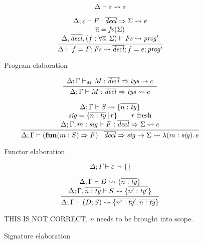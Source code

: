 \documentclass{article}
\begin{document}
\begin{figure}[H]

\[
\Delta \vdash \varepsilon \leadsto{} \varepsilon
\]

\[
\frac{
\begin{array}{c}
\Delta; \varepsilon \vdash F : \overline{\mathit{decl}} \Rightarrow \Sigma \leadsto{} e \\
\overline{a} = \mathit{fv}(\Sigma) \\
\Delta, \overline{\mathit{decl}}, (f : \forall \overline{a}.\, \Sigma) \vdash \mathit{Fs} \leadsto{} \mathit{prog}'\\
\end{array}
}{
\Delta \vdash f = F; \mathit{Fs}
\leadsto{} \overline{\mathit{decl}}; f = e; \mathit{prog}'
}
\]

\caption{Program elaboration}
\end{figure}

\begin{figure}[H]

\[
\frac{
\begin{array}{c}
\Delta; \Gamma \vdash_M M : \overline{\mathit{decl}} \Rightarrow \mathit{tys} \leadsto{} e \\
\end{array}
}{
\Delta; \Gamma \vdash M : \overline{\mathit{decl}} \Rightarrow \mathit{tys} \leadsto{} e
}
\]

\[
\frac{
\begin{array}{c}
\Delta; \Gamma \vdash S \leadsto \{ \overline{n : \mathit{ty}} \} \\
\mathit{sig} = \{ \overline{n : \mathit{ty}} \,|\, r \} \qquad
r~\mbox{fresh} \\
\Delta; \Gamma, m : \mathit{sig} \vdash F : \overline{\mathit{decl}} \Rightarrow \Sigma \leadsto{} e \\
\end{array}
}{
\Delta; \Gamma \vdash (\mathbf{fun} (m : S) \Rightarrow F) : \overline{\mathit{decl}} \Rightarrow \mathit{sig} \rightarrow \Sigma \leadsto{} \lambda (m : \mathit{sig}).\, e
}
\]

\caption{Functor elaboration}
\end{figure}

\begin{figure}[H]

\[
\Delta; \Gamma \vdash \varepsilon \leadsto \{ \}
\]

\[
\frac{
\begin{array}{c}
\Delta; \Gamma \vdash D \leadsto \{ \overline{n : \mathit{ty}} \} \\
\Delta; \Gamma, \overline{n : \mathit{ty}} \vdash S \leadsto \{ \overline{n' : \mathit{ty}'} \} \\
\end{array}
}{
\Delta; \Gamma \vdash (D; S) \leadsto \{ \overline{n' : \mathit{ty}'}, \overline{n : \mathit{ty}} \}
}
\]
\caption{Signature elaboration}

THIS IS NOT CORRECT, $n$ needs to be brought into scope.
\end{figure}
\end{document}
